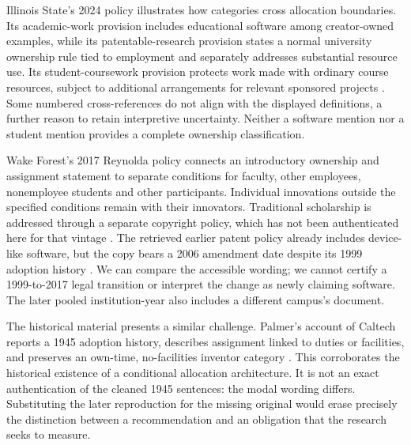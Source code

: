 \documentclass[12pt]{article}
\begin{document}
Illinois State's 2024 policy illustrates how categories cross allocation boundaries. Its academic-work provision includes educational software among creator-owned examples, while its patentable-research provision states a normal university ownership rule tied to employment and separately addresses substantial resource use. Its student-coursework provision protects work made with ordinary course resources, subject to additional arrangements for relevant sponsored projects \citep[sections 2.9, 2.12 and 3.1--3.2]{isu2024}. Some numbered cross-references do not align with the displayed definitions, a further reason to retain interpretive uncertainty. Neither a software mention nor a student mention provides a complete ownership classification.

Wake Forest's 2017 Reynolda policy connects an introductory ownership and assignment statement to separate conditions for faculty, other employees, nonemployee students and other participants. Individual innovations outside the specified conditions remain with their innovators. Traditional scholarship is addressed through a separate copyright policy, which has not been authenticated here for that vintage \citep[sections 3.1--3.4]{wfu2017}. The retrieved earlier patent policy already includes device-like software, but the copy bears a 2006 amendment date despite its 1999 adoption history \citep{wfu2006}. We can compare the accessible wording; we cannot certify a 1999-to-2017 legal transition or interpret the change as newly claiming software. The later pooled institution-year also includes a different campus's document.

The historical material presents a similar challenge. Palmer's account of Caltech reports a 1945 adoption history, describes assignment linked to duties or facilities, and preserves an own-time, no-facilities inventor category \citep[pp. 55--57]{palmer1962}. This corroborates the historical existence of a conditional allocation architecture. It is not an exact authentication of the cleaned 1945 sentences: the modal wording differs. Substituting the later reproduction for the missing original would erase precisely the distinction between a recommendation and an obligation that the research seeks to measure.
\end{document}
